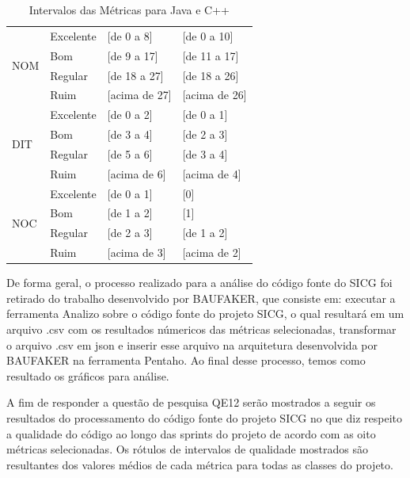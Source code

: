 \begin{table}[!ht]
\begin{center}
\begin{tabular}{ |l|l|l|l| }
		\multirow{4}{*}{NOM} 
		 & Excelente & [de 0 a 8] & [de 0 a 10] \\
		 & Bom & [de 9 a 17] & [de 11 a 17] \\
		 & Regular & [de 18 a 27] & [de 18 a 26] \\
		 & Ruim & [acima de 27] & [acima de 26] \\ \hline

		\multirow{4}{*}{DIT} 
		 & Excelente & [de 0 a 2] & [de 0 a 1] \\
		 & Bom & [de 3 a 4] & [de 2 a 3] \\
		 & Regular & [de 5 a 6] & [de 3 a 4] \\
		 &
		  Ruim & [acima de 6] & [acima de 4] \\ \hline

		\multirow{4}{*}{NOC} 
		 & Excelente & [de 0 a 1] & [0] \\
		 & Bom & [de 1 a 2] & [1] \\
		 & Regular & [de 2 a 3] & [de 1 a 2] \\
		 & Ruim & [acima de 3] & [acima de 2] \\ \hline

	\end{tabular}
	\caption{Intervalos das Métricas para Java e C++}
	\label{metrics}
	\end{center}
	\end{table}

De forma geral, o processo realizado para a análise do código fonte do SICG foi retirado do trabalho desenvolvido por BAUFAKER, que  consiste em: executar a ferramenta Analizo sobre o código fonte do projeto SICG, o qual resultará em um arquivo .csv com os resultados númericos das métricas selecionadas, transformar o arquivo .csv em json e inserir esse arquivo na arquitetura desenvolvida por BAUFAKER na ferramenta Pentaho. Ao final desse processo, temos como resultado os gráficos para análise. 

A fim de responder a questão de pesquisa QE12 serão mostrados a seguir os resultados do processamento do código fonte do projeto SICG no que diz respeito a qualidade do código ao longo das sprints do projeto de acordo com as oito métricas selecionadas. Os rótulos de intervalos de qualidade mostrados são resultantes dos valores médios de cada métrica para todas as classes do projeto. 

